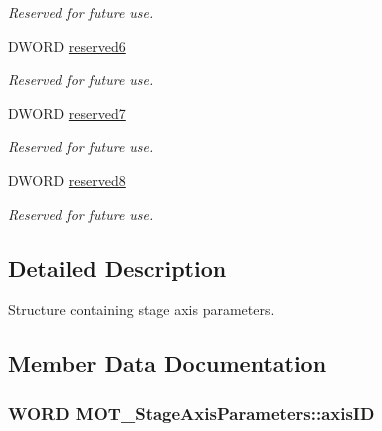 \begin{DoxyCompactItemize}
\begin{DoxyCompactList}\small\item\em Reserved for future use. \end{DoxyCompactList}\item 
D\+W\+O\+RD \hyperlink{struct_m_o_t___stage_axis_parameters_af716ca04f14b6f4a7d065f4f8a43e3c9}{reserved6}
\begin{DoxyCompactList}\small\item\em Reserved for future use. \end{DoxyCompactList}\item 
D\+W\+O\+RD \hyperlink{struct_m_o_t___stage_axis_parameters_aed3853fc3a8d4cf881474e441814f2d4}{reserved7}
\begin{DoxyCompactList}\small\item\em Reserved for future use. \end{DoxyCompactList}\item 
D\+W\+O\+RD \hyperlink{struct_m_o_t___stage_axis_parameters_a3ad1382c247a3acc06ee643d57d44e55}{reserved8}
\begin{DoxyCompactList}\small\item\em Reserved for future use. \end{DoxyCompactList}\end{DoxyCompactItemize}


\subsection{Detailed Description}
Structure containing stage axis parameters. 



\subsection{Member Data Documentation}
\subsubsection[{\texorpdfstring{axis\+ID}{axisID}}]{\setlength{\rightskip}{0pt plus 5cm}W\+O\+RD M\+O\+T\+\_\+\+Stage\+Axis\+Parameters\+::axis\+ID}\hypertarget{struct_m_o_t___stage_axis_parameters_a436a4f469bfa98f9a82001d79a89b8a6}{}\label{struct_m_o_t___stage_axis_parameters_a436a4f469bfa98f9a82001d79a89b8a6}


